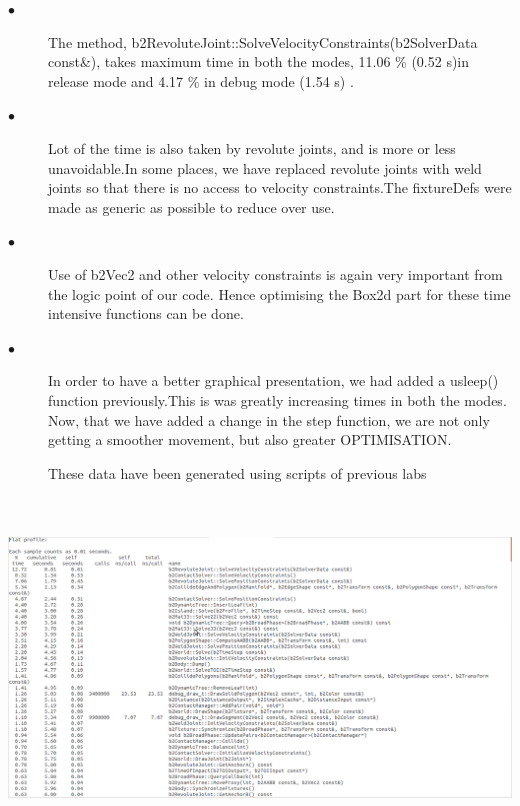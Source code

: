 \documentclass[11pt]{article}
\begin{document}
\begin{description}
\newline
\item[$\bullet$ ]
The method, b2RevoluteJoint::SolveVelocityConstraints(b2SolverData const\&), takes maximum time in both the modes, 11.06 \% (0.52 s)in release mode and 4.17 \% in debug mode (1.54 s) . 
\newline
\item[$\bullet$ ]
Lot of the time is also taken by revolute joints, and is more or less unavoidable.In some places, we have replaced revolute joints with weld joints so that there is no access to velocity constraints.The fixtureDefs were made as generic as possible to reduce over use.
\newline
\item[$\bullet$ ]
Use of b2Vec2 and other velocity constraints is again very important from the logic point of our code. Hence optimising the Box2d part for these time intensive functions can be done.
\newline
\item[$\bullet$ ]
In order to have a better graphical presentation, we had added a usleep() function previously.This is was greatly increasing times in both the modes. Now, that we have added a change in the step function, we are not only getting a smoother movement, but also greater OPTIMISATION.
\newline

These data have been generated using scripts of previous labs \cite{pyscript}
\end{description}

\includegraphics[height=9cm]{./images/debug_dat1.png}
\end{document}
